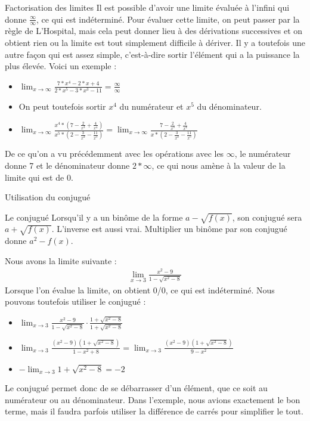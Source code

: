 \documentclass[10pt, french]{article}
\begin{document}
\begin{multicols*}{2}
\begin{rappel}{Factorisation des limites}
Il est possible d'avoir une limite évaluée à l'infini qui donne $\frac{\infty}{\infty}$, ce qui est indéterminé. Pour   évaluer cette limite, on peut passer par la règle de L'Hospital, mais cela peut donner lieu à des dérivations successives et on obtient rien ou la limite est tout simplement difficile à dériver. Il y a toutefois une autre façon qui est assez simple, c'est-à-dire sortir l'élément qui a la puissance la plus élevée. Voici un exemple :
  \begin{itemize}
  \item $\lim_{x \to \infty} \frac{7*x^{4}-2*x+4}{2*x^{5}-3*x^{3}-11} = \frac{\infty}{\infty}$
  \item On peut toutefois sortir $x^{4}$ du numérateur et $x^{5}$ du dénominateur.
  \item $\lim_{x \to \infty} \frac{x^{4}*(7-\frac{2}{x^{3}}+\frac{4}{x^{4}})}{x^{5}*(2-\frac{3}{x^{2}}-\frac{11}{x^{5}})}     = \lim_{x \to \infty} \frac{7-\frac{2}{x^{3}}+\frac{4}{x^{4}}}{x*(2-\frac{3}{x^{2}}-\frac{11}{x^{5}})}$
  \end{itemize}
De ce qu'on a vu précédemment avec les opérations avec les $\infty$, le numérateur donne 7 et le dénominateur donne $2*\infty$, ce qui nous amène à la valeur de la limite qui est de 0.
\end{rappel}

\begin{rappel}{Utilisation du conjugué}
  \begin{rappel}{Le conjugué}
    Lorsqu'il y a un binôme de la forme $a-\sqrt{f(x)}$, son conjugué sera $a+\sqrt{f(x)}$. L'inverse est aussi vrai. Multiplier un binôme par son conjugué donne $a^{2}-f(x)$.
  \end{rappel}
  Nous avons la limite suivante :
  \begin{align*}
    \lim_{x \to 3} \frac{x^{2}-9}{1-\sqrt{x^{2}-8}}
  \end{align*}
  Lorsque l'on évalue la limite, on obtient 0/0, ce qui est indéterminé. Nous pouvons toutefois utiliser le conjugué :
  \begin{itemize}
  \item  $\lim_{x \to 3} \frac{x^{2}-9}{1-\sqrt{x^{2}-8}} \cdot \frac{1+\sqrt{x^{2}-8}}{1+\sqrt{x^{2}-8}}$
  \item $\lim_{x \to 3} \frac{(x^{2}-9)(1+\sqrt{x^{2}-8})}{1-x^{2}+8} = \lim_{x \to 3} \frac{(x^{2}-9)(1+\sqrt{x^{2}-8})}{9-x^{2}}$
  \item $-\lim_{x \to 3} 1+\sqrt{x^{2}-8} = -2$
  \end{itemize}
  Le conjugué permet donc de se débarrasser d'un élément, que ce soit au numérateur ou au dénominateur. Dans l'exemple, nous avions exactement le bon terme, mais il faudra parfois utiliser la différence de carrés pour simplifier le tout.
\end{rappel}


\end{multicols*}
\end{document}
